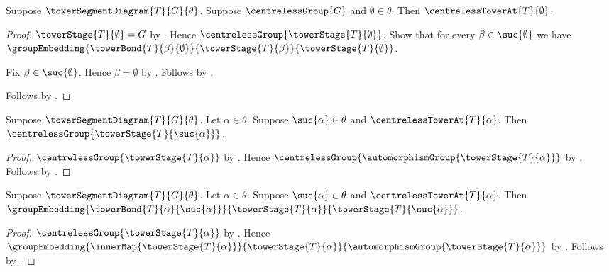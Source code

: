 \begin{proposition}\label{centreless_tower_at_zero}
    Suppose $\towerSegmentDiagram{T}{G}{\theta}$.
    Suppose $\centrelessGroup{G}$ and $\emptyset\in\theta$.
    Then $\centrelessTowerAt{T}{\emptyset}$.
\end{proposition}
\begin{proof}
    $\towerStage{T}{\emptyset}=G$ by
        .
    Hence $\centrelessGroup{\towerStage{T}{\emptyset}}$.
    Show that for every $\beta\in\suc{\emptyset}$ we have
        $\groupEmbedding
            {\towerBond{T}{\beta}{\emptyset}}
            {\towerStage{T}{\beta}}
            {\towerStage{T}{\emptyset}}$.
    \begin{subproof}
        Fix $\beta\in\suc{\emptyset}$.
        Hence $\beta=\emptyset$ by .
        Follows by .
    \end{subproof}
    Follows by .
\end{proof}

\begin{proposition}\label{centreless_tower_successor_stage}
    Suppose $\towerSegmentDiagram{T}{G}{\theta}$.
    Let $\alpha\in\theta$.
    Suppose $\suc{\alpha}\in\theta$ and
        $\centrelessTowerAt{T}{\alpha}$.
    Then $\centrelessGroup{\towerStage{T}{\suc{\alpha}}}$.
\end{proposition}
\begin{proof}
    $\centrelessGroup{\towerStage{T}{\alpha}}$ by
        .
    Hence $\centrelessGroup{
        \automorphismGroup{\towerStage{T}{\alpha}}}$ by
        .
    Follows by .
\end{proof}

\begin{proposition}\label{centreless_tower_successor_immediate_embedding}
    Suppose $\towerSegmentDiagram{T}{G}{\theta}$.
    Let $\alpha\in\theta$.
    Suppose $\suc{\alpha}\in\theta$ and
        $\centrelessTowerAt{T}{\alpha}$.
    Then $\groupEmbedding
        {\towerBond{T}{\alpha}{\suc{\alpha}}}
        {\towerStage{T}{\alpha}}
        {\towerStage{T}{\suc{\alpha}}}$.
\end{proposition}
\begin{proof}
    $\centrelessGroup{\towerStage{T}{\alpha}}$ by
        .
    Hence $\groupEmbedding
        {\innerMap{\towerStage{T}{\alpha}}}
        {\towerStage{T}{\alpha}}
        {\automorphismGroup{\towerStage{T}{\alpha}}}$ by
        .
    Follows by .
\end{proof}


